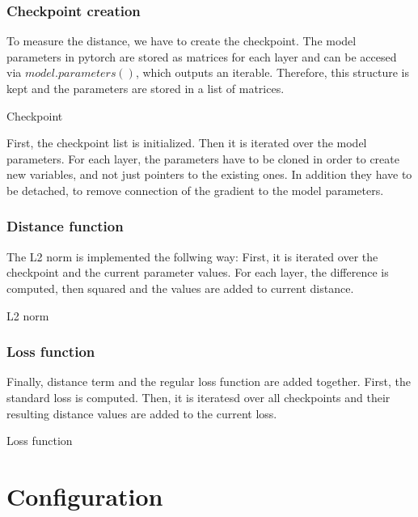 \subsubsection{Checkpoint creation}
To measure the distance, we have to create the checkpoint. The model parameters
in pytorch are stored as matrices for each layer and can be accesed via
$model.parameters()$, which outputs an iterable. Therefore, this structure is kept and the parameters are stored in a list of matrices.
\begin{algorithm}[h!]
    \caption{Checkpoint}\label{alg:Checkpoint}
    \lstset{language=Python}
    
\end{algorithm}
\newline
First, the checkpoint list is initialized. Then it is iterated over the model
parameters. For each layer, the parameters have to be cloned in order to create
new variables, and not just pointers to the existing ones. In addition they have
to be detached, to remove connection of the gradient to the model parameters.

\subsubsection{Distance function}
The L2 norm is implemented the follwing way: First, it is iterated over the checkpoint and
the current parameter values. For each layer, the difference is computed, 
then squared and the values are added to current distance.
\begin{algorithm}[h!]
    \caption{L2 norm}\label{alg:L2Norm}
    \lstset{language=Python}
    
\end{algorithm}

\subsubsection{Loss function}
Finally, distance term and the regular loss function are added together. First,
the standard loss is computed. Then, it is iteratesd over all checkpoints and 
their resulting distance values are added to the current loss.
\begin{algorithm}[h!]
    \caption{Loss function}
    \lstset{language=Python}
    
\end{algorithm}



\section{Configuration}

